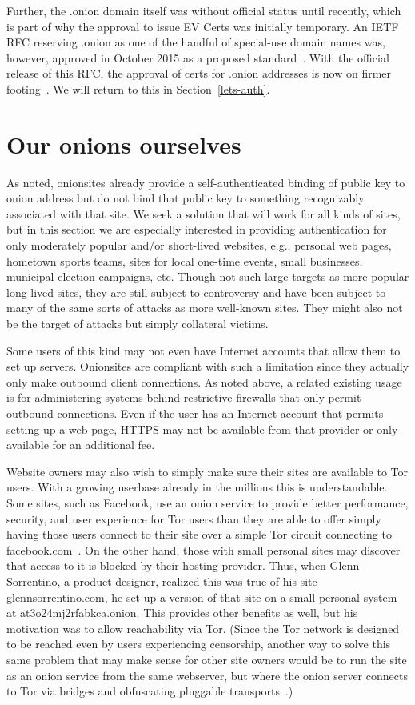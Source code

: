 \documentclass[10pt, conference, compsocconf]{styles/IEEEtran}
\begin{document}
Further, the .onion domain itself was without official status until
recently, which is part of why the approval to issue EV Certs was initially
temporary. An IETF RFC reserving .onion as one of the handful of
special-use domain names was, however, approved in October 2015 as a
proposed standard~\cite{ietf-onion-tld-rfc}.  With the official
release of this RFC, the approval of certs for .onion addresses is now
on firmer footing~\cite{7686-and-all}. We will return to this
in Section~\ref{lets-auth}.


\section{Our onions ourselves}
\label{ourselves}

As noted, onionsites already provide a self-authenticated binding of
public key to onion address but do not bind that public key to
something recognizably associated with that site.  We seek a solution
that will work for all kinds of sites, but in this section we are
especially interested in providing authentication for only moderately
popular and/or short-lived websites, e.g., personal web pages,
hometown sports teams, sites for local one-time events, small
businesses, municipal election campaigns, etc.  Though not such large
targets as more popular long-lived sites, they are still subject to
controversy and have been subject to many of the same sorts of attacks
as more well-known sites.  They might also not be the target of
attacks but simply collateral victims.

Some users of this kind may not even have Internet accounts that allow
them to set up servers. Onionsites are compliant with such a
limitation since they actually only make outbound client
connections. As noted above, a related existing usage is for
administering systems behind restrictive firewalls that only permit
outbound connections.  Even if the user has an Internet account that
permits setting up a web page, HTTPS may not be available from that
provider or only available for an additional fee.

Website owners may also wish to simply make sure their sites are
available to Tor users. With a growing userbase already in the
millions this is understandable.  Some sites, such as Facebook, use an
onion service to provide better performance, security, and user
experience for Tor users than they are able to offer simply having
those users connect to their site over a simple Tor circuit connecting
to facebook.com~\cite{7686-and-all}. On the other hand, those with
small personal sites may discover that access to it is blocked by
their hosting provider.  Thus, when Glenn Sorrentino, a product
designer, realized this was true of his site glennsorrentino.com, he
set up a version of that site on a small personal system at
at3o24mj2rfabkca.onion. This provides other benefits as well, but his
motivation was to allow reachability via Tor. (Since the Tor network
is designed to be reached even by users experiencing censorship,
another way to solve this same problem that may make sense for other
site owners would be to run the site as an onion service from the same
webserver, but where the onion server connects to Tor via bridges and
obfuscating pluggable transports~\cite{bridges}.)
\end{document}
